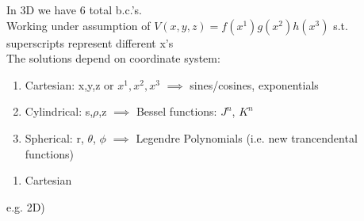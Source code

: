\documentclass{article}
\begin{document}
In 3D we have 6 total b.c.'s.\\

Working under assumption of $V(x,y,z) = f(x^{1})g(x^{2})h(x^{3})$ s.t. superscripts represent different x's\\

The solutions depend on coordinate system:
\begin{enumerate}
	\item Cartesian: x,y,z or $x^1, x^2, x^3$ $\implies$ sines/cosines, exponentials
	\item Cylindrical: s,$\rho$,z $\implies$ Bessel functions: $J^n$, $K^{n}$
	\item Spherical: r, $\theta$, $\phi$ $\implies$ Legendre Polynomials
		(i.e. new trancendental functions)
\end{enumerate}

\begin{enumerate}
	\item Cartesian
\end{enumerate}


e.g. 2D) 








\end{document}
